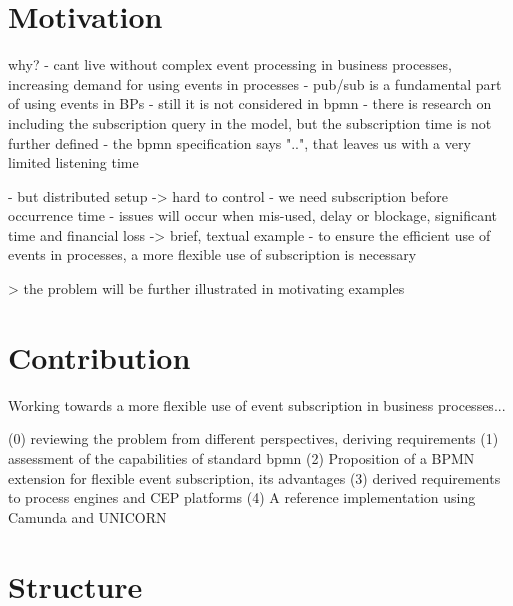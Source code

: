 \section{Motivation}
why?
- cant live without complex event processing in business processes, increasing demand for using events in processes
- pub/sub is a fundamental part of using events in BPs
- still it is not considered in bpmn
- there is research on including the subscription query in the model, but the subscription time is not further defined
- the bpmn specification says "..", that leaves us with a very limited listening time

- but distributed setup -> hard to control
- we need subscription before occurrence time
- issues will occur when mis-used, delay or blockage, significant time and financial loss
-> brief, textual example
- to ensure the efficient use of events in processes, a more flexible use of subscription is necessary

> the problem will be further illustrated in motivating examples


\section{Contribution}
Working towards a more flexible use of event subscription in business processes...

(0) reviewing the problem from different perspectives, deriving requirements
(1) assessment of the capabilities of standard bpmn
(2) Proposition of a BPMN extension for flexible event subscription, its advantages
(3) derived requirements to process engines and CEP platforms
(4) A reference implementation using Camunda and UNICORN


\section{Structure}
